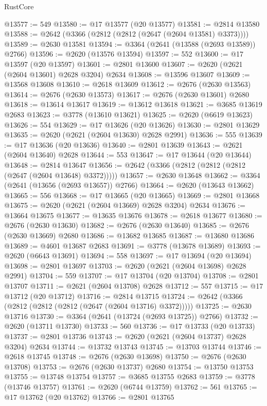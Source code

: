\begin{lexlean}{RustCore}
\begin{coremodule}
@13577 := 549
@13580 := @17 @13577 (@20 @13577)
@13581 := @2814 @13580
@13588 := @2642 (@3366 (@2812 (@2812 (@2647 (@2604 @13581) @3373))))
@13589 := @2630 @13581
@13594 := @3364 (@2641 (@13588 (@2693 @13589)) @2766)
@13596 := @2620 (@13576 @13594)
@13597 := 552
@13600 := @17 @13597 (@20 @13597)
@13601 := @2801 @13600
@13607 := @2620 (@2621 (@2604 @13601) @2628 @3204) @2634
@13608 := @13596 @13607
@13609 := @13568 @13608
@13610 := @2618 @13609
@13612 := @2676 (@2630 @13563)
@13614 := @2676 (@2630 @13573)
@13617 := @2676 (@2630 @13601) @2680
@13618 := @13614 @13617
@13619 := @13612 @13618
@13621 := @3685 @13619 @2683
@13623 := @3778 (@13610 @13621)
@13625 := @2620 (@6619 @13623)
@13626 := 554
@13629 := @17 @13626 (@20 @13626)
@13630 := @2801 @13629
@13635 := @2620 (@2621 (@2604 @13630) @2628 @2991)
@13636 := 555
@13639 := @17 @13636 (@20 @13636)
@13640 := @2801 @13639
@13643 := @2621 (@2604 @13640) @2628
@13644 := 553
@13647 := @17 @13644 (@20 @13644)
@13648 := @2814 @13647
@13656 := @2642 (@3366 (@2812 (@2812 (@2812 (@2647 (@2604 @13648) @3372)))))
@13657 := @2630 @13648
@13662 := @3364 (@2641 (@13656 (@2693 @13657)) @2766)
@13664 := @2620 (@13643 @13662)
@13665 := 556
@13668 := @17 @13665 (@20 @13665)
@13669 := @2801 @13668
@13675 := @2620 (@2621 (@2604 @13669) @2628 @3204) @2634
@13676 := @13664 @13675
@13677 := @13635 @13676
@13678 := @2618 @13677
@13680 := @2676 (@2630 @13630)
@13682 := @2676 (@2630 @13640)
@13685 := @2676 (@2630 @13669) @2680
@13686 := @13682 @13685
@13687 := @13680 @13686
@13689 := @4601 @13687 @2683
@13691 := @3778 (@13678 @13689)
@13693 := @2620 (@6643 @13691)
@13694 := 558
@13697 := @17 @13694 (@20 @13694)
@13698 := @2801 @13697
@13703 := @2620 (@2621 (@2604 @13698) @2628 @2991)
@13704 := 559
@13707 := @17 @13704 (@20 @13704)
@13708 := @2801 @13707
@13711 := @2621 (@2604 @13708) @2628
@13712 := 557
@13715 := @17 @13712 (@20 @13712)
@13716 := @2814 @13715
@13724 := @2642 (@3366 (@2812 (@2812 (@2812 (@2647 (@2604 @13716) @3372)))))
@13725 := @2630 @13716
@13730 := @3364 (@2641 (@13724 (@2693 @13725)) @2766)
@13732 := @2620 (@13711 @13730)
@13733 := 560
@13736 := @17 @13733 (@20 @13733)
@13737 := @2801 @13736
@13743 := @2620 (@2621 (@2604 @13737) @2628 @3204) @2634
@13744 := @13732 @13743
@13745 := @13703 @13744
@13746 := @2618 @13745
@13748 := @2676 (@2630 @13698)
@13750 := @2676 (@2630 @13708)
@13753 := @2676 (@2630 @13737) @2680
@13754 := @13750 @13753
@13755 := @13748 @13754
@13757 := @3685 @13755 @2683
@13759 := @3778 (@13746 @13757)
@13761 := @2620 (@6744 @13759)
@13762 := 561
@13765 := @17 @13762 (@20 @13762)
@13766 := @2801 @13765

\end{coremodule}
\end{lexlean}
